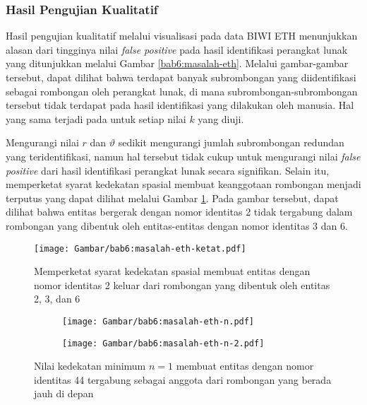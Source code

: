 \subsubsection{Hasil Pengujian Kualitatif}
\label{subsubsec:eth-qualitative}

Hasil pengujian kualitatif melalui visualisasi pada data BIWI ETH menunjukkan alasan dari tingginya nilai \textit{false positive} pada hasil identifikasi perangkat lunak yang ditunjukkan melalui Gambar \ref{bab6:masalah-eth}. Melalui gambar-gambar tersebut, dapat dilihat bahwa terdapat banyak subrombongan yang diidentifikasi sebagai rombongan oleh perangkat lunak, di mana subrombongan-subrombongan tersebut tidak terdapat pada hasil identifikasi yang dilakukan oleh manusia. Hal yang sama terjadi pada untuk setiap nilai $k$ yang diuji.

Mengurangi nilai $r$ dan $\vartheta$ sedikit mengurangi jumlah subrombongan redundan yang teridentifikasi, namun hal tersebut tidak cukup untuk mengurangi nilai \textit{false positive} dari hasil identifikasi perangkat lunak secara signifikan. Selain itu, memperketat syarat kedekatan spasial membuat keanggotaan rombongan menjadi terputus yang dapat dilihat melalui Gambar \ref{bab6:masalah-syarat-ketat-eth}. Pada gambar tersebut, dapat dilihat bahwa entitas bergerak dengan nomor identitas 2 tidak tergabung dalam rombongan yang dibentuk oleh entitas-entitas dengan nomor identitas 3 dan 6.

\begin{figure}[h]
    \centering
    \captionsetup{width=0.6\textwidth}
    \texttt{[image: Gambar/bab6:masalah-eth-ketat.pdf]}
    \caption[Dampak ketatnya syarat kedekatan spasial pada data ETH]{Memperketat syarat kedekatan spasial membuat entitas dengan nomor identitas 2 keluar dari rombongan yang dibentuk oleh entitas 2, 3, dan 6}
    \label{bab6:masalah-syarat-ketat-eth}
\end{figure}

\begin{figure}[h]
    \centering
    \captionsetup{width=.6\textwidth}
    \begin{subfigure}[t]{0.175\textwidth}
        \centering
        \texttt{[image: Gambar/bab6:masalah-eth-n.pdf]}
    \end{subfigure}
    \begin{subfigure}[t]{0.175\textwidth}
        \centering
        \texttt{[image: Gambar/bab6:masalah-eth-n-2.pdf]}
    \end{subfigure}
    \caption[Masalah nilai $n$ pada data BIWI ETH]{Nilai kedekatan minimum $n = 1$ membuat entitas dengan nomor identitas 44 tergabung sebagai anggota dari rombongan yang berada jauh di depan}
    \label{bab6:masalah-eth-n}
\end{figure}

